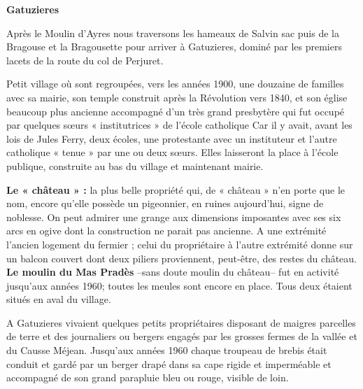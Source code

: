 
\begin{center}
    {\Large\bfseries Gatuzieres}
\end{center}

\vspace{0.45cm}

Après le Moulin d’Ayres nous traversons les hameaux de Salvin sac puis de la Bragouse et la
Bragousette pour arriver à Gatuzieres, dominé par les premiers lacets de la route du col de Perjuret.

\vspace{0.3cm}

Petit village où sont regroupées, vers les années 1900, une douzaine de familles avec sa mairie,
son temple construit après la Révolution vers 1840, et son église beaucoup plus ancienne
accompagné d’un très grand presbytère qui fut occupé par quelques sœurs « institutrices » de
l’école catholique Car il y avait, avant les lois de Jules Ferry, deux écoles, une protestante
avec un instituteur et l’autre catholique « tenue » par une ou deux sœurs. Elles laisseront la
place à l’école publique, construite au bas du village et maintenant mairie.

\vspace{0.3cm}

\textbf{Le « château » :} la plus belle propriété qui, de « château » n’en porte que le nom, encore qu’elle
possède un pigeonnier, en ruines aujourd’hui, signe de noblesse. On peut admirer une grange aux
dimensions imposantes avec ses six arcs en ogive dont la construction ne parait pas ancienne. A une
extrémité l’ancien logement du fermier ; celui du propriétaire à l’autre extrémité donne sur un
balcon couvert dont deux piliers proviennent, peut-être, des restes du château. \textbf{Le moulin du Mas
Pradès} --sans doute moulin du château-- fut en activité jusqu’aux années 1960; toutes les meules sont
encore en place. Tous deux étaient situés en aval du village.

\vspace{0.3cm}

A Gatuzieres vivaient quelques petits propriétaires disposant de maigres parcelles de terre et
des journaliers ou bergers engagés par les grosses fermes de la vallée et du Causse Méjean.
Jusqu’aux années 1960 chaque troupeau de brebis était conduit et gardé par un berger drapé
dans sa cape rigide et imperméable et accompagné de son grand parapluie bleu ou rouge,
visible de loin.


